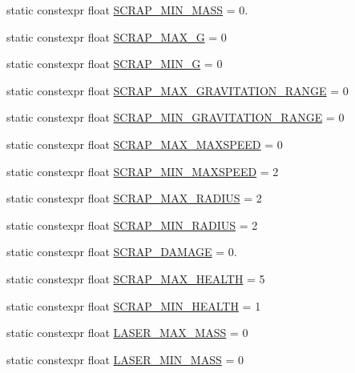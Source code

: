 \begin{DoxyCompactItemize}
static constexpr float \hyperlink{class_act_conf_a29e1e2d930866f1f2e8ed704fef9f9fa}{S\+C\+R\+A\+P\+\_\+\+M\+I\+N\+\_\+\+M\+A\+S\+S} = 0.
\item 
static constexpr float \hyperlink{class_act_conf_a1b9bf891b49592f6021e7b960c8b5a42}{S\+C\+R\+A\+P\+\_\+\+M\+A\+X\+\_\+\+G} = 0
\item 
static constexpr float \hyperlink{class_act_conf_aecb30bfc7bb1532ca26587a0d5b444dd}{S\+C\+R\+A\+P\+\_\+\+M\+I\+N\+\_\+\+G} = 0
\item 
static constexpr float \hyperlink{class_act_conf_af5662a75e1870b58983d804a10a9785d}{S\+C\+R\+A\+P\+\_\+\+M\+A\+X\+\_\+\+G\+R\+A\+V\+I\+T\+A\+T\+I\+O\+N\+\_\+\+R\+A\+N\+G\+E} = 0
\item 
static constexpr float \hyperlink{class_act_conf_a48a1ab9d0a01057a576a75c0ef9bffe1}{S\+C\+R\+A\+P\+\_\+\+M\+I\+N\+\_\+\+G\+R\+A\+V\+I\+T\+A\+T\+I\+O\+N\+\_\+\+R\+A\+N\+G\+E} = 0
\item 
static constexpr float \hyperlink{class_act_conf_abd5b4bb7fc133a5d7958ffdec5665530}{S\+C\+R\+A\+P\+\_\+\+M\+A\+X\+\_\+\+M\+A\+X\+S\+P\+E\+E\+D} = 0
\item 
static constexpr float \hyperlink{class_act_conf_a010191bef8eca8eea3ed78cc5841fed6}{S\+C\+R\+A\+P\+\_\+\+M\+I\+N\+\_\+\+M\+A\+X\+S\+P\+E\+E\+D} = 2
\item 
static constexpr float \hyperlink{class_act_conf_a06e5824b72a7d1b80da8545e389234f2}{S\+C\+R\+A\+P\+\_\+\+M\+A\+X\+\_\+\+R\+A\+D\+I\+U\+S} = 2
\item 
static constexpr float \hyperlink{class_act_conf_afe61b0f80b163325f965ad9c7835e2a4}{S\+C\+R\+A\+P\+\_\+\+M\+I\+N\+\_\+\+R\+A\+D\+I\+U\+S} = 2
\item 
static constexpr float \hyperlink{class_act_conf_a940e6fbaa1f93fe8f39c303eee646466}{S\+C\+R\+A\+P\+\_\+\+D\+A\+M\+A\+G\+E} = 0.
\item 
static constexpr float \hyperlink{class_act_conf_ab74a900ac35ead3064251ec3b2a3044d}{S\+C\+R\+A\+P\+\_\+\+M\+A\+X\+\_\+\+H\+E\+A\+L\+T\+H} = 5
\item 
static constexpr float \hyperlink{class_act_conf_ad1832e09b6b2b9bde0b2b354e998a39b}{S\+C\+R\+A\+P\+\_\+\+M\+I\+N\+\_\+\+H\+E\+A\+L\+T\+H} = 1
\item 
static constexpr float \hyperlink{class_act_conf_ab40d08f0b16d79f814df80dce3d68f0b}{L\+A\+S\+E\+R\+\_\+\+M\+A\+X\+\_\+\+M\+A\+S\+S} = 0
\item 
static constexpr float \hyperlink{class_act_conf_aa91df73e67c99df1c57f086903e2ef0f}{L\+A\+S\+E\+R\+\_\+\+M\+I\+N\+\_\+\+M\+A\+S\+S} = 0

\end{DoxyCompactItemize}
